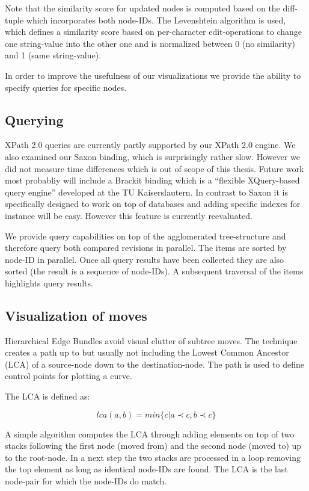 Note that the similarity score for updated nodes is computed based on the diff-tuple which incorporates both node-IDs. The Levenshtein algorithm is used, which defines a similarity score based on per-character edit-operations to change one string-value into the other one and is normalized between 0 (no similarity) and 1 (same string-value). 

In order to improve the usefulness of our visualizations we provide the ability to specify queries for specific nodes.

\subsection{Querying}
XPath 2.0 queries are currently partly supported by our XPath 2.0 engine. We also examined our Saxon\cite{Saxon} binding, which is surprisingly rather slow. However we did not measure time differences which is out of scope of this thesis. Future work most probabliy will include a Brackit\cite{Brackit} binding which is a ``flexible XQuery-based query engine'' developed at the TU Kaiserslautern. In contrast to Saxon it is specifically designed to work on top of databases and adding specific indexes for instance will be easy. However this feature is currently reevaluated.

We provide query capabilities on top of the agglomerated tree-structure and therefore query both compared revisions in parallel. The items are sorted by node-ID in parallel. Once all query results have been collected they are also sorted (the result is a sequence of node-IDs). A subsequent traversal of the items highlights query results.

\subsection{Visualization of moves}
Hierarchical Edge Bundles\cite{Bundles} avoid visual clutter of subtree moves. The technique creates a path up to but usually not including the Lowest Common Ancestor (LCA) of a source-node down to the destination-node. The path is used to define control points for plotting a curve.

The LCA is defined as:

\begin{equation}
lca(a{,} b) = min\{c|a \prec c, b \prec c\}
\end{equation}

A simple algorithm computes the LCA through adding elements on top of two stacks following the first node (moved from) and the second node (moved to) up to the root-node. In a next step the two stacks are processed in a loop removing the top element as long as identical node-IDs are found. The LCA is the last node-pair for which the node-IDs do match.

